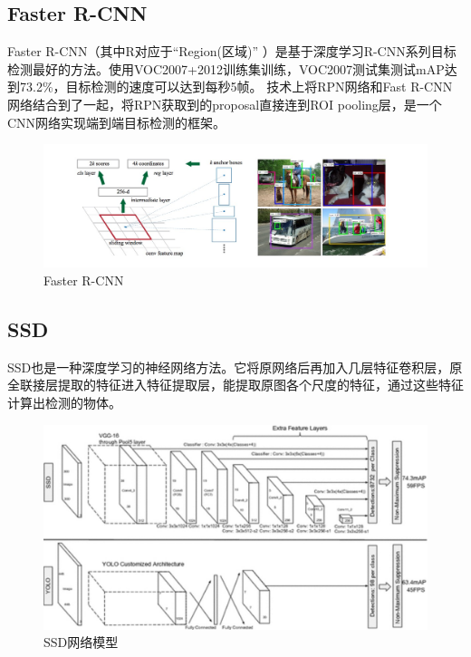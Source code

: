 \subsection{Faster R-CNN\cite{faster}}{
Faster R-CNN（其中R对应于“Region(区域)” ）是基于深度学习R-CNN系列目标检测最好的方法。使用VOC2007+2012训练集训练，VOC2007测试集测试mAP达到73.2\%，目标检测的速度可以达到每秒5帧。
技术上将RPN网络和Fast R-CNN网络结合到了一起，将RPN获取到的proposal直接连到ROI pooling层，是一个CNN网络实现端到端目标检测的框架。
\begin{figure}[htbp]
\centering
\includegraphics[width=5in]{images/Faster.png}
\caption{Faster R-CNN}
\label{Faster}
\end{figure}
}

\subsection{SSD\cite{ssd}}{
SSD也是一种深度学习的神经网络方法。它将原网络后再加入几层特征卷积层，原全联接层提取的特征进入特征提取层，能提取原图各个尺度的特征，通过这些特征计算出检测的物体。
\begin{figure}[htbp]
\centering
\includegraphics[width=5in]{images/SSD.png}
\caption{SSD网络模型}
\label{SSD}
\end{figure}
}

